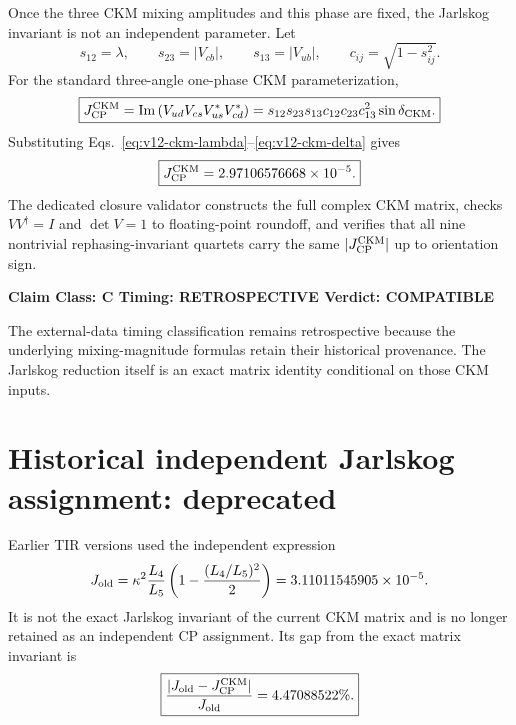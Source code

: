 \documentclass[11pt,a4paper,twoside]{book}
\theoremstyle{definition}
\newcommand{\vTwelveStatus}[3]{\par\noindent\textbf{Claim Class: #1 \quad Timing: #2 \quad Verdict: #3}\par}
\begin{document}
Once the three CKM mixing amplitudes and this phase are fixed, the Jarlskog
invariant is not an independent parameter.  Let
\begin{equation}
s_{12}=\lambda,
\qquad
s_{23}=|V_{cb}|,
\qquad
s_{13}=|V_{ub}|,
\qquad
c_{ij}=\sqrt{1-s_{ij}^2}.
\label{eq:v12-ckm-sines}
\end{equation}
For the standard three-angle one-phase CKM parameterization,
\begin{equation}
\boxed{
J_{\rm CP}^{\rm CKM}
=\operatorname{Im}
\left(V_{ud}V_{cs}V_{us}^{\ast}V_{cd}^{\ast}\right)
=s_{12}s_{23}s_{13}c_{12}c_{23}c_{13}^{2}\sin\delta_{\rm CKM}.
}
\label{eq:v12-ckm-jarlskog}
\end{equation}
Substituting Eqs.~\eqref{eq:v12-ckm-lambda}--\eqref{eq:v12-ckm-delta}
gives
\begin{equation}
\boxed{
J_{\rm CP}^{\rm CKM}
=2.97106576668\times10^{-5}.
}
\label{eq:v12-ckm-jarlskog-value}
\end{equation}
The dedicated closure validator constructs the full complex CKM matrix,
checks $VV^\dagger=I$ and $\det V=1$ to floating-point roundoff, and verifies
that all nine nontrivial rephasing-invariant quartets carry the same
$|J_{\rm CP}^{\rm CKM}|$ up to orientation sign.

\vTwelveStatus{C}{RETROSPECTIVE}{COMPATIBLE}
The external-data timing classification remains retrospective because the
underlying mixing-magnitude formulas retain their historical provenance.  The
Jarlskog reduction itself is an exact matrix identity conditional on those CKM
inputs.

\section{Historical independent Jarlskog assignment: deprecated}
Earlier TIR versions used the independent expression
\begin{equation}
J_{\rm old}
=\kappa^2\frac{L_4}{L_5}
\left(1-\frac{(L_4/L_5)^2}{2}\right)
=3.11011545905\times10^{-5}.
\label{eq:v12-ckm-j-old}
\end{equation}
It is not the exact Jarlskog invariant of the current CKM matrix and is no
longer retained as an independent CP assignment.  Its gap from the exact matrix
invariant is
\begin{equation}
\boxed{
\frac{|J_{\rm old}-J_{\rm CP}^{\rm CKM}|}{J_{\rm old}}
=4.47088522\%.
}
\label{eq:v12-ckm-j-old-gap}
\end{equation}
\end{document}
